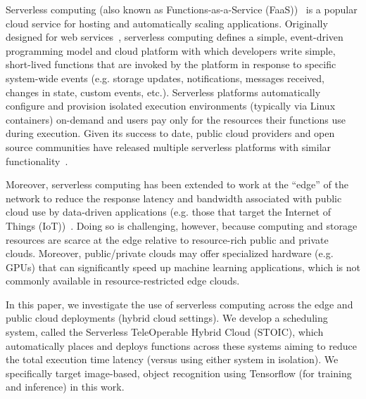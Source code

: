 Serverless computing (also known as Functions-as-a-Ser\-vice (FaaS))~\cite{ref:aws-lambda,ref:faas3,ref:afunctions-16} is a popular cloud service for hosting and automatically scaling applications. Originally designed for web services~\cite{ref:lambda-webservices,ref:lambda-microservices}, serverless computing defines a simple, event-driven programming model and cloud platform with which developers write simple, short-lived functions that are invoked by the platform in response to specific system-wide events (e.g. storage updates, notifications, messages received, changes in state, custom events, etc.). Serverless platforms automatically configure and provision isolated execution environments (typically via Linux containers) on-demand and users pay only for the resources their functions use during execution. Given its success to date, public cloud providers and open source communities have released multiple serverless platforms with similar functionality~\cite{ref:aws-lambda,ref:afunctions-16,ref:gfunctions-16,cspot19,ref:openwhisk-16,ref:ironio-16}.

Moreover, serverless computing has been extended to work at the ``edge'' of the network to reduce the response latency and bandwidth associated with public cloud use by data-driven applications (e.g.  those that target the Internet of Things (IoT))~\cite{ aws-greengrass, iothub-web, iotedge-web}. Doing so is challenging, however, because computing and storage resources are scarce at the edge relative to resource-rich public and private clouds. Moreover, public/private clouds may offer specialized hardware (e.g. GPUs) that can significantly speed up machine learning applications, which is not commonly available in resource-restricted edge clouds.

In this paper, we investigate the use of serverless computing across the edge and public cloud deployments (hybrid cloud settings). We develop a scheduling system, called the Serverless TeleOperable Hybrid Cloud (STOIC), which automatically places and deploys functions across these systems aiming to reduce the total execution time latency (versus using either system in isolation). We specifically target image-based, object recognition using Tensorflow (for training and inference) in this work.

